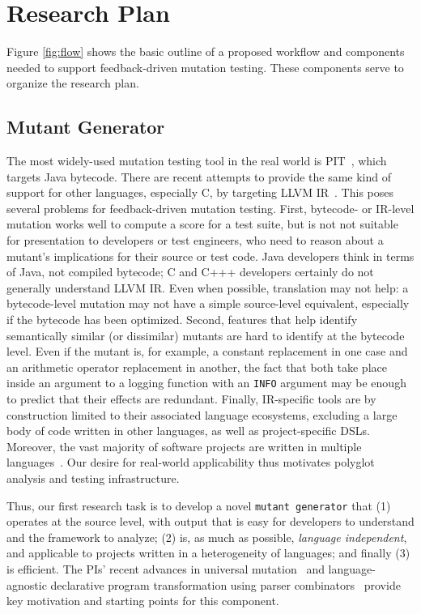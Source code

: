 \section{Research Plan}

Figure \ref{fig:flow} shows the basic outline of a proposed workflow
and components needed to support feedback-driven mutation testing.
These components serve to organize the research plan.

\subsection{Mutant Generator}
\label{sec:anylangplan}

The most widely-used mutation testing tool in the real world
is PIT~\cite{pittest}, which targets Java bytecode.  There are recent attempts
to provide the same kind of support for other languages, especially C, by
targeting LLVM IR~\cite{HaririLLVM,Mart}.  This poses several problems for
feedback-driven mutation testing.
First, bytecode- or IR-level mutation works well to compute a
score for a test suite, but is not not suitable for presentation to developers
or test engineers, who need to reason about a mutant's implications for their
source or test code.   Java developers
think in terms of Java, not compiled bytecode; C and C+++ developers certainly
do not generally understand LLVM IR.  Even when possible, translation may not help: a bytecode-level
mutation may not have a simple source-level equivalent, especially if the
bytecode has been optimized.  Second, features that help identify semantically
similar (or dissimilar) mutants are hard to identify at the bytecode level.  Even if the mutant
is, for example, a constant replacement in one case and an arithmetic operator
replacement in another, the fact that both take place inside an argument to a
logging function with an {\tt INFO} argument may be enough to predict that their
effects are redundant.
Finally, IR-specific tools are by construction limited to their associated
language ecosystems, excluding a large body of code written in other languages,
as well as project-specific DSLs.
Moreover, the vast majority of software projects are written
in multiple languages~\cite{Ray2014}.  Our desire for real-world applicability
thus motivates polyglot analysis and testing infrastructure.

Thus, our first research task is to develop a novel {\tt mutant generator} that
(1) operates at the source level, with output that is easy for developers to
understand and the framework to analyze; (2) is, as much as possible,
\emph{language independent}, and applicable to projects written in a
heterogeneity of languages; and finally (3) is efficient.  The PIs' recent
advances in universal mutation~\cite{regexpMut,universalmutator} and
language-agnostic declarative program transformation using parser
combinators~\cite{rvt-ppc} provide key motivation and starting points for this
component.

